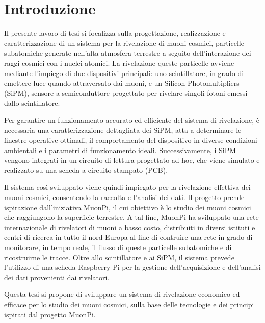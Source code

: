 \chapter*{Introduzione}
Il presente lavoro di tesi si focalizza sulla progettazione, realizzazione e caratterizzazione di un sistema per la rivelazione di muoni 
cosmici, particelle subatomiche generate nell’alta atmosfera terrestre a seguito dell'interazione dei raggi cosmici con i nuclei atomici. 
La rivelazione queste particelle avviene mediante l’impiego di due dispositivi principali: uno scintillatore, in grado di emettere luce quando attraversato
dai muoni, e un Silicon Photomultipliers (SiPM), sensore a semiconduttore progettato per rivelare singoli fotoni emessi dallo scintillatore.

Per garantire un funzionamento accurato ed efficiente del sistema di rivelazione, è necessaria una caratterizzazione dettagliata dei SiPM, 
atta a determinare le finestre operative ottimali, il comportamento del dispositivo in diverse condizioni ambientali e i parametri di 
funzionamento ideali. Successivamente, i SiPM vengono integrati in un circuito di lettura progettato ad hoc, che viene simulato e 
realizzato su una scheda a circuito stampato (PCB).

Il sistema così sviluppato viene quindi impiegato per la rivelazione effettiva dei muoni cosmici, consentendo la raccolta e l’analisi dei 
dati. Il progetto prende ispirazione dall'iniziativa MuonPi, il cui obiettivo è lo studio dei muoni cosmici che raggiungono la superficie 
terrestre. A tal fine, MuonPi \cite{muonpiwikicontributors_2017} ha sviluppato una rete internazionale di rivelatori di muoni a basso costo,
distribuiti in diversi istituti e centri di ricerca in tutto il nord Europa al fine di contruire una rete in grado di monitorare,
in tempo reale, il flusso di queste particelle subatomiche e di ricostruirne le tracce. Oltre allo scintillatore e ai SiPM, il sistema 
prevede l’utilizzo di una scheda Raspberry Pi per la gestione dell’acquisizione e dell’analisi dei dati provenienti dai rivelatori.

Questa tesi si propone di sviluppare un sistema di rivelazione economico ed efficace per lo studio dei muoni cosmici, sulla base delle 
tecnologie e dei principi ispirati dal progetto MuonPi.

